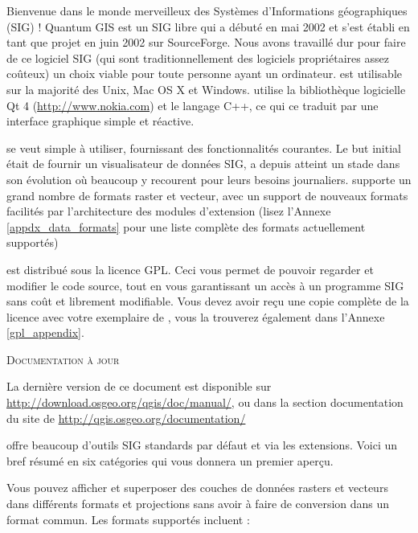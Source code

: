 \mainmatter
\pagestyle{scrheadings}
\label{label_forward}

Bienvenue dans le monde merveilleux des Systèmes d'Informations géographiques (SIG) ! Quantum GIS est un SIG libre qui a débuté en mai 2002 et s'est établi en tant que projet en juin 2002 sur SourceForge. Nous avons travaillé dur pour faire de ce logiciel SIG (qui sont traditionnellement des logiciels propriétaires assez coûteux) un choix viable pour toute personne ayant un ordinateur. \qg est utilisable sur la majorité des Unix, Mac OS X et Windows. \qg utilise la bibliothèque logicielle Qt 4 (\url{http://www.nokia.com}) et le langage C++, ce qui ce traduit par une interface graphique simple et réactive.

\qg se veut simple à utiliser, fournissant des fonctionnalités courantes. Le but initial était de fournir un visualisateur de données SIG, \qg a depuis atteint un stade dans son évolution où beaucoup y recourent pour leurs besoins journaliers. \qg supporte un grand nombre de formats raster et vecteur, avec un support de nouveaux formats facilités par l'architecture des modules d'extension (lisez l'Annexe \ref{appdx_data_formats} pour une liste complète des formats actuellement supportés)

\qg est distribué sous la licence GPL. Ceci vous permet de pouvoir regarder et modifier le code source, tout en vous garantissant un accès à un programme SIG sans coût et librement modifiable. Vous devez avoir reçu une copie complète de la licence avec votre exemplaire de \qg, vous la trouverez également dans l'Annexe \ref{gpl_appendix}.

\begin{Tip}\caption{\textsc{Documentation à jour}}
La dernière version de ce document est disponible sur \url{http://download.osgeo.org/qgis/doc/manual/}, ou dans la section documentation du site de \qg \url{http://qgis.osgeo.org/documentation/}
\end{Tip}

\label{label_majfeat}

\qg offre beaucoup d'outils SIG standards par défaut et via les extensions. Voici un bref résumé en six catégories qui vous donnera un premier aperçu.


Vous pouvez afficher et superposer des couches de données rasters et vecteurs dans différents formats et projections sans avoir à faire de conversion dans un format commun. Les formats supportés incluent :

